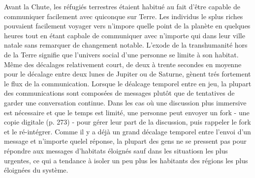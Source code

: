    Avant la Chute, les réfugiés terrestres étaient habitué au fait d'être capable de communiquer facilement avec quiconque sur Terre. Les individus le splus riches pouvaient facilement voyager vers n'impore quelle point de la planète en quelques heures tout en étant capbale de communiquer avec n'importe qui dans leur ville natale sans remarquer de changement notable. L'exode de la transhumanité hors de la Terre signifie que l'univers social d'une personne se limite à son habitat. Même des décalages relativement court, de deux à trente secondes en moyenne pour le décalage entre deux lunes de Jupiter ou de Saturne, gènent trés fortement le flux de la communication. Lorsque le déalcage temporel entre en jeu, la plupart des communications sont composées de messages plutôt que de tentatives de garder une conversation continue. Dans les cas où une discussion plus immersive est nécessaire et que le temps est limité, une personne peut envoyer un fork - une copie digitale (p. 273) - pour gérer leur part de la discussion, puis rappeler le fork et le ré-intégrer. Comme il y a déjà un grand décalage temporel entre l'envoi d'un message et n'importe quelel réponse, la plupart des gens ne se pressent pas pour répondre aux messages d'habitats éloignés sauf dans les situatiosn les plus urgentes, ce qui a tendance à isoler un peu plus les habitants des régions les plus éloignées du système. 

